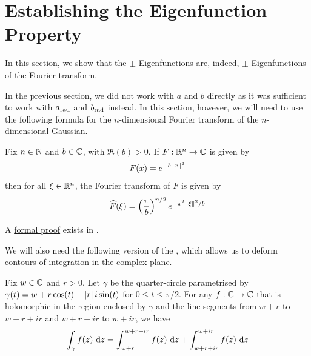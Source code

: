 \section{Establishing the Eigenfunction Property}


In this section, we show that the $\pm$-Eigenfunctions are, indeed, $\pm$-Eigenfunctions of the Fourier transform.

In the previous section, we did not work with $a$ and $b$ directly as it was sufficient to work with $a_{\operatorname{rad}}$ and $b_{\operatorname{rad}}$ instead. In this section, however, we will need to use the following formula for the $n$-dimensional Fourier transform of the $n$-dimensional Gaussian.

\begin{boxtheorem}\label{Ch4:Thm:GaussianFourier}
    Fix $n \in \mathbb{N}$ and $b \in \mathbb{C}$, with $\Re(b) > 0$. If $F : \mathbb{R}^n \to \mathbb{C}$ is given by
    \begin{align*}
        F(x) = e^{-b \left\lVert x \right\rVert^2}
    \end{align*}
    then for all $\xi \in \mathbb{R}^n$, the Fourier transform of $F$ is given by
    \begin{align*}
        \widehat{F}\!\left( \xi \right) = \left( \frac{\pi}{b} \right)^{{n} / {2}} e^{{- \pi^2 \left\lVert \xi \right\rVert^2} / {b}}
    \end{align*}
\end{boxtheorem}
A \href{https://github.com/leanprover-community/mathlib4/blob/5a2eaa85c555c4263e15928cef249cbaad2eb2d2/Mathlib/Analysis/SpecialFunctions/Gaussian/FourierTransform.lean#L360-L363}{formal proof} exists in \mathlib.

We will also need the following version of the \CGT, which allows us to deform contours of integration in the complex plane.

\begin{boxtheorem}\label{Ch4:Thm:CGTRectCircle}
    Fix $w \in \mathbb{C}$ and $r > 0$. Let $\gamma$ be the quarter-circle parametrised by $\gamma(t) = w + r\cos\!{\left( t \right)} + \left\lvert r \right\rvert i \sin\!{\left( t \right)}$ for $0 \leq t \leq \pi/2$. For any $f : \mathbb{C} \to \mathbb{C}$ that is holomorphic in the region enclosed by $\gamma$ and the line segments from $w + r$ to $w + r + ir$ and $w + r + ir$ to $w + ir$, we have
    \begin{align*}
        \int_{\gamma} f(z) \, \operatorname{d}\!{z}
        = \int_{w + r}^{w + r + ir} f(z) \, \operatorname{d}\!{z} + \int_{w + r + ir}^{w + ir} f(z) \, \operatorname{d}\!{z}
    \end{align*}
\end{boxtheorem}

